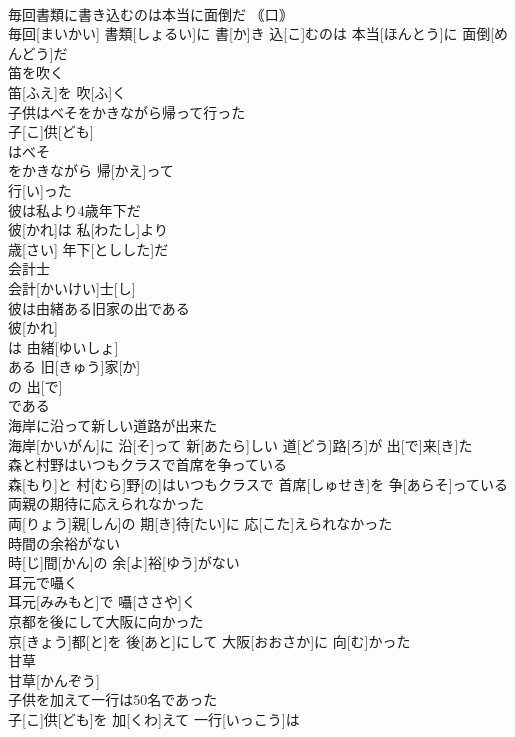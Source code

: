 \documentclass[8pt]{extreport}
\begin{document}
\begin{CJK}{UTF8}{min}
\\	毎回書類に書き込むのは本当に面倒だ	｟口｠ 
\\	毎回[まいかい] 書類[しょるい]に 書[か]き 込[こ]むのは 本当[ほんとう]に 面倒[めんどう]だ
\\	笛を吹く	
\\	笛[ふえ]を 吹[ふ]く
\\	子供はべそをかきながら帰って行った	
\\	子[こ]供[ども]
\\	はべそ 
\\	をかきながら 帰[かえ]って 
\\	行[い]った 
\\	彼は私より4歳年下だ	
\\	彼[かれ]は 私[わたし]より 
\\	歳[さい] 年下[としした]だ
\\	会計士	
\\	会計[かいけい]士[し]
\\	彼は由緒ある旧家の出である	
\\	彼[かれ]
\\	は 由緒[ゆいしょ]
\\	ある 旧[きゅう]家[か]
\\	の 出[で]
\\	である
\\	海岸に沿って新しい道路が出来た	
\\	海岸[かいがん]に 沿[そ]って 新[あたら]しい 道[どう]路[ろ]が 出[で]来[き]た
\\	森と村野はいつもクラスで首席を争っている	
\\	森[もり]と 村[むら]野[の]はいつもクラスで 首席[しゅせき]を 争[あらそ]っている
\\	両親の期待に応えられなかった	
\\	両[りょう]親[しん]の 期[き]待[たい]に 応[こた]えられなかった
\\	時間の余裕がない	
\\	時[じ]間[かん]の 余[よ]裕[ゆう]がない
\\	耳元で囁く	
\\	耳元[みみもと]で 囁[ささや]く
\\	京都を後にして大阪に向かった	
\\	京[きょう]都[と]を 後[あと]にして 大阪[おおさか]に 向[む]かった
\\	甘草	
\\	甘草[かんぞう]
\\	子供を加えて一行は50名であった	
\\	子[こ]供[ども]を 加[くわ]えて 一行[いっこう]は 

\end{CJK}
\end{document}
